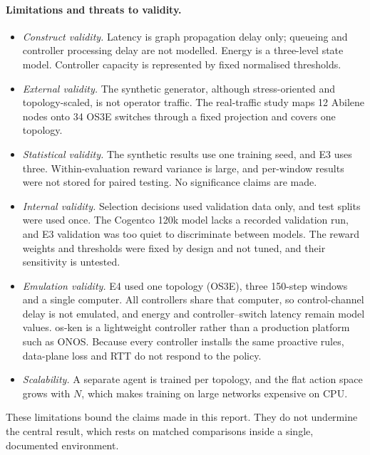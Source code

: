 \paragraph{Limitations and threats to validity.}
\begin{itemize}[leftmargin=*]
  \item \emph{Construct validity.} Latency is graph propagation delay only; queueing and controller processing delay are not modelled. Energy is a three-level state model. Controller capacity is represented by fixed normalised thresholds.
  \item \emph{External validity.} The synthetic generator, although stress-oriented and topology-scaled, is not operator traffic. The real-traffic study maps 12 Abilene nodes onto 34 OS3E switches through a fixed projection and covers one topology.
  \item \emph{Statistical validity.} The synthetic results use one training seed, and E3 uses three. Within-evaluation reward variance is large, and per-window results were not stored for paired testing. No significance claims are made.
  \item \emph{Internal validity.} Selection decisions used validation data only, and test splits were used once. The Cogentco 120k model lacks a recorded validation run, and E3 validation was too quiet to discriminate between models. The reward weights and thresholds were fixed by design and not tuned, and their sensitivity is untested.
  \item \emph{Emulation validity.} E4 used one topology (OS3E), three 150-step windows and a single computer. All controllers share that computer, so control-channel delay is not emulated, and energy and controller--switch latency remain model values. os-ken is a lightweight controller rather than a production platform such as ONOS. Because every controller installs the same proactive rules, data-plane loss and RTT do not respond to the policy.
  \item \emph{Scalability.} A separate agent is trained per topology, and the flat action space grows with $N$, which makes training on large networks expensive on CPU.
\end{itemize}
These limitations bound the claims made in this report. They do not undermine the central result, which rests on matched comparisons inside a single, documented environment.
